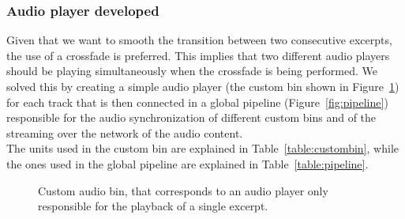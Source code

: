 \subsubsection*{Audio player developed}
\label{subsec:audioplayer}
Given that we want to smooth the transition between two consecutive excerpts, the use of a crossfade is preferred. This implies that two different audio players should be playing simultaneously when the crossfade is being performed. We solved this by creating a simple audio player (the custom bin shown in Figure~\ref{fig:custombin}) for each track that is then connected in a global pipeline (Figure~\ref{fig:pipeline}) responsible for the audio synchronization of different custom bins and of the streaming over the network of the audio content. \\ The units used in the custom bin are explained in Table~\ref{table:custombin}, while the ones used in the global pipeline are explained in Table~\ref{table:pipeline}. \\

\begin{figure}[h]
\caption[Custom audio bin]{Custom audio bin, that corresponds to an audio player only responsible for the playback of a single excerpt.}
\label{fig:custombin}
\end{figure}

\makeatletter
\newcommand\footnoteref[1]{\protected@xdef\@thefnmark{\ref{#1}}\@footnotemark}
\makeatother

